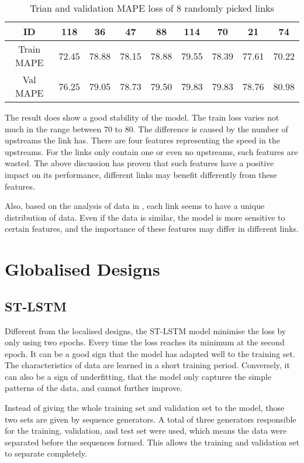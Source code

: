 \begin{table}[!htb]
    \centering
    \begin{tabular}{c|cccccccc}
    \toprule
    ID & 118 & 36 & 47 & 88 & 114 & 70 & 21 & 74 \\
    \midrule
    Train MAPE & 72.45 & 78.88 & 78.15 & 78.88 & 79.55 & 78.39 & 77.61 & 70.22 \\
    Val MAPE & 76.25 & 79.05 & 78.73 & 79.50 & 79.83 & 79.83 & 78.76 & 80.98 \\
    \bottomrule
    \end{tabular}
    \caption{Trian and validation MAPE loss of 8 randomly picked links}
    \label{Table:spatiallstm-links}
\end{table}

The result does show a good stability of the model. The train loss varies not much in the range between 70 to 80. 
The difference is caused by the number of upstreams the link has. There are four features representing the speed in the upstreams. 
For the links only contain one or even no upstreams, such features are wasted. 
The above discussion has proven that such features have a positive impact on its performance, different links may benefit differently from these features. 

Also, based on the analysis of data in , each link seems to have a unique distribution of data. 
Even if the data is similar, the model is more sensitive to certain features, and the importance of these features may differ in different links. 

\section{Globalised Designs}

\subsection{ST-LSTM}

Different from the localised designs, the ST-LSTM model minimise the loss by only using two epochs. Every time the loss reaches its minimum at the second epoch. 
It can be a good sign that the model has adapted well to the training set. The characteristics of data are learned in a short training period. 
Conversely, it can also be a sign of underfitting, that the model only captures the simple patterns of the data, and cannot further improve.

Instead of giving the whole training set and validation set to the model, those two sets are given by sequence generators. 
A total of three generators responsible for the training, validation, and test set were used, which means the data were separated before the sequences formed. 
This allows the training and validation set to separate completely. 

